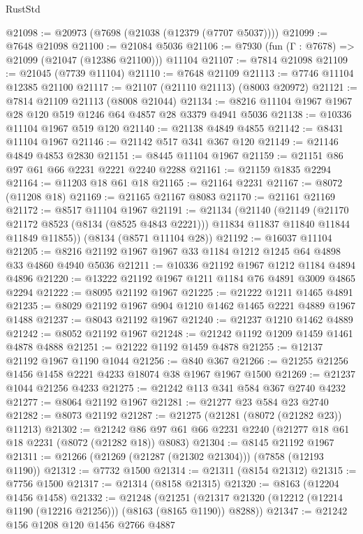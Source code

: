\begin{lexlean}{RustStd}
\begin{coremodule}
{\begin{coremodule}
{{{{{{{{{{{{{{{{{{{{{{{{{{{{{{{{{{{{{{{{{{{{{{{{{{{{{@21098 := @20973 (@7698 (@21038 (@12379 (@7707 @5037))))
@21099 := @7648 @21098
@21100 := @21084 @5036
@21106 := @7930 (fun (Γ : @7678) => @21099 (@21047 (@12386 @21100))) @11104
@21107 := @7814 @21098
@21109 := @21045 (@7739 @11104)
@21110 := @7648 @21109
@21113 := @7746 @11104 @12385 @21100
@21117 := @21107 (@21110 @21113) (@8003 @20972)
@21121 := @7814 @21109 @21113 (@8008 @21044)
@21134 := @8216 @11104 @1967 @1967 @28 @120 @519 @1246 @64 @4857 @28 @3379 @4941 @5036
@21138 := @10336 @11104 @1967 @519 @120
@21140 := @21138 @4849 @4855
@21142 := @8431 @11104 @1967
@21146 := @21142 @517 @341 @367 @120
@21149 := @21146 @4849 @4853 @2830
@21151 := @8445 @11104 @1967
@21159 := @21151 @86 @97 @61 @66 @2231 @2221 @2240 @2288
@21161 := @21159 @1835 @2294
@21164 := @11203 @18 @61 @18
@21165 := @21164 @2231
@21167 := @8072 (@11208 @18)
@21169 := @21165 @21167 @8083
@21170 := @21161 @21169
@21172 := @8517 @11104 @1967
@21191 := @21134
    (@21140
      (@21149
        (@21170 @21172 @8523 (@8134 (@8525 @4843 @2221)))
        @11834
        @11837
        @11840
        @11844
        @11849
        @11855))
    (@8134 (@8571 @11104 @28))
@21192 := @16037 @11104
@21205 := @8216 @21192 @1967 @1967 @33 @1184 @1212 @1245 @64 @4898 @33 @4860 @4940 @5036
@21211 := @10336 @21192 @1967 @1212 @1184 @4894 @4896
@21220 := @13222 @21192 @1967 @1211 @1184 @76 @4891 @3009 @4865 @2294
@21222 := @8095 @21192 @1967
@21225 := @21222 @1211 @1465 @4891
@21235 := @8029 @21192 @1967 @904 @1210 @1462 @1465 @2221 @4889 @1967 @1488
@21237 := @8043 @21192 @1967
@21240 := @21237 @1210 @1462 @4889
@21242 := @8052 @21192 @1967
@21248 := @21242 @1192 @1209 @1459 @1461 @4878 @4888
@21251 := @21222 @1192 @1459 @4878
@21255 := @12137 @21192 @1967 @1190 @1044
@21256 := @840 @367
@21266 := @21255 @21256 @1456 @1458 @2221 @4233 @18074 @38 @1967 @1967 @1500
@21269 := @21237 @1044 @21256 @4233
@21275 := @21242 @113 @341 @584 @367 @2740 @4232
@21277 := @8064 @21192 @1967
@21281 := @21277 @23 @584 @23 @2740
@21282 := @8073 @21192
@21287 := @21275 (@21281 (@8072 (@21282 @23)) @11213)
@21302 := @21242 @86 @97 @61 @66 @2231 @2240 (@21277 @18 @61 @18 @2231 (@8072 (@21282 @18)) @8083)
@21304 := @8145 @21192 @1967
@21311 := @21266 (@21269 (@21287 (@21302 @21304))) (@7858 (@12193 @1190))
@21312 := @7732 @1500
@21314 := @21311 (@8154 @21312)
@21315 := @7756 @1500
@21317 := @21314 (@8158 @21315)
@21320 := @8163 (@12204 @1456 @1458)
@21332 := @21248
    (@21251 (@21317 @21320 (@12212 (@12214 @1190 (@12216 @21256))) (@8163 (@8165 @1190)) @8288))
@21347 := @21242
    @156
    @1208
    @120
    @1456
    @2766
    @4887
}}}}}}}}}}}}}}}}}}}}}}}}}}}}}}}}}}}}}}}}}}}}}}}}}}}}}
\end{coremodule}}
\end{coremodule}
\end{lexlean}
